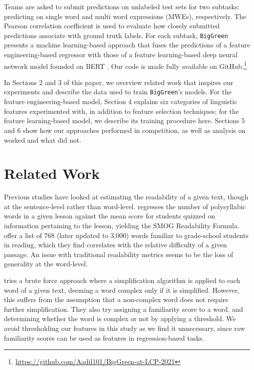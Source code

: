 \documentclass{dcthesis}
\theoremstyle{definition}
\theoremstyle{remark}
\begin{document}
Teams are asked to submit predictions on unlabeled test sets for two subtasks: predicting on single word and multi word expressions (MWEs), respectively. The Pearson correlation coefficient is used to evaluate how closely submitted predictions associate with ground truth labels. For each subtask, \texttt{BigGreen} presents a machine learning-based approach that fuses the predictions of a feature engineering-based regressor with those of a feature learning-based deep neural network model founded on BERT \citep{devlin2018bert}. Our code is made fully available on GitHub.\footnote{\url{https://github.com/Aadil101/BigGreen-at-LCP-2021}}

In Sections 2 and 3 of this paper, we overview related work that inspires our experiments and describe the data used to train \texttt{BigGreen}'s models. For the feature engineering-based model, Section 4 explains six categories of linguistic features experimented with, in addition to feature selection techniques; for the feature learning-based model, we describe its training procedure here. Sections 5 and 6 show how our approaches performed in competition, as well as analysis on worked and what did not.

\chapter{Related Work}

Previous studies have looked at estimating the readability of a given text, though at the sentence-level rather than word-level. \citet{mc1969smog} regresses the number of polysyllabic words in a given lesson against the mean score for students quizzed on information pertaining to the lesson, yielding the SMOG Readability Formula. \citet{dale1948formula} offer a list of 768 (later updated to 3,000) words familiar to grade-school students in reading, which they find correlates with the relative difficulty of a given passage. An issue with traditional readability metrics seems to be the loss of generality at the word-level.

\citet{shardlow2013comparison} tries a brute force approach where a simplification algorithm is applied to each word of a given text, deeming a word complex only if it is simplified. However, this suffers from the assumption that a non-complex word does not require further simplification. They also try assigning a familiarity score to a word, and determining whether the word is complex or not by applying a threshold. We avoid thresholding our features in this study as we find it unnecessary, since raw familiarity scores can be used as features in regression-based tasks. 
\end{document}
